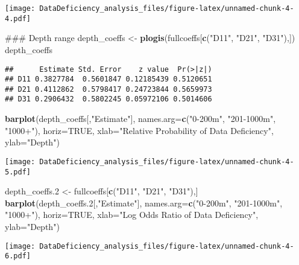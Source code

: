 \documentclass[]{article}
\newenvironment{Shaded}{\begin{snugshade}}{\end{snugshade}}
\newcommand{\KeywordTok}[1]{\textcolor[rgb]{0.13,0.29,0.53}{\textbf{#1}}}
\newcommand{\DataTypeTok}[1]{\textcolor[rgb]{0.13,0.29,0.53}{#1}}
\newcommand{\DecValTok}[1]{\textcolor[rgb]{0.00,0.00,0.81}{#1}}
\newcommand{\StringTok}[1]{\textcolor[rgb]{0.31,0.60,0.02}{#1}}
\newcommand{\OtherTok}[1]{\textcolor[rgb]{0.56,0.35,0.01}{#1}}
\newcommand{\NormalTok}[1]{#1}
\begin{document}
\texttt{[image: DataDeficiency\_analysis\_files/figure-latex/unnamed-chunk-4-4.pdf]}

\begin{Shaded}
\begin{Highlighting}[]
\NormalTok{### Depth range}
\NormalTok{depth_coeffs <-}\StringTok{ }\KeywordTok{plogis}\NormalTok{(fullcoeffs[}\KeywordTok{c}\NormalTok{(}\StringTok{"D11"}\NormalTok{, }\StringTok{"D21"}\NormalTok{, }\StringTok{"D31"}\NormalTok{),])}
\NormalTok{depth_coeffs}
\end{Highlighting}
\end{Shaded}

\begin{verbatim}
##      Estimate Std. Error    z value  Pr(>|z|)
## D11 0.3827784  0.5601847 0.12185439 0.5120651
## D21 0.4112862  0.5798417 0.24723844 0.5659973
## D31 0.2906432  0.5802245 0.05972106 0.5014606
\end{verbatim}

\begin{Shaded}
\begin{Highlighting}[]
\KeywordTok{barplot}\NormalTok{(depth_coeffs[,}\StringTok{"Estimate"}\NormalTok{], }\DataTypeTok{names.arg=}\KeywordTok{c}\NormalTok{(}\StringTok{"0-200m"}\NormalTok{, }\StringTok{"201-1000m"}\NormalTok{, }\StringTok{"1000+"}\NormalTok{), }\DataTypeTok{horiz=}\OtherTok{TRUE}\NormalTok{, }\DataTypeTok{xlab=}\StringTok{"Relative Probability of Data Deficiency"}\NormalTok{, }\DataTypeTok{ylab=}\StringTok{"Depth"}\NormalTok{)}
\end{Highlighting}
\end{Shaded}

\texttt{[image: DataDeficiency\_analysis\_files/figure-latex/unnamed-chunk-4-5.pdf]}

\begin{Shaded}
\begin{Highlighting}[]
\NormalTok{depth_coeffs.}\DecValTok{2}\NormalTok{ <-}\StringTok{ }\NormalTok{fullcoeffs[}\KeywordTok{c}\NormalTok{(}\StringTok{"D11"}\NormalTok{, }\StringTok{"D21"}\NormalTok{, }\StringTok{"D31"}\NormalTok{),]}
\KeywordTok{barplot}\NormalTok{(depth_coeffs.}\DecValTok{2}\NormalTok{[,}\StringTok{"Estimate"}\NormalTok{], }\DataTypeTok{names.arg=}\KeywordTok{c}\NormalTok{(}\StringTok{"0-200m"}\NormalTok{, }\StringTok{"201-1000m"}\NormalTok{, }\StringTok{"1000+"}\NormalTok{), }\DataTypeTok{horiz=}\OtherTok{TRUE}\NormalTok{, }\DataTypeTok{xlab=}\StringTok{"Log Odds Ratio of Data Deficiency"}\NormalTok{, }\DataTypeTok{ylab=}\StringTok{"Depth"}\NormalTok{)}
\end{Highlighting}
\end{Shaded}

\texttt{[image: DataDeficiency\_analysis\_files/figure-latex/unnamed-chunk-4-6.pdf]}
\end{document}
